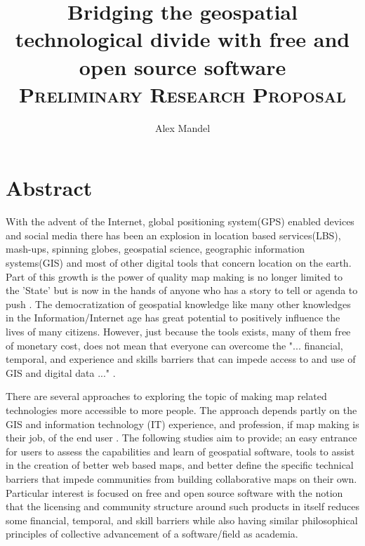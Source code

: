 \documentclass[12pt,letterpaper]{article}
\author{Alex Mandel}
\title{Bridging the geospatial technological divide with free and open source software
\\	
\textsc{\small Preliminary Research Proposal}\\[0.5cm]
}
\begin{document}
\maketitle
\tableofcontents
\onehalfspace
\section{Abstract}

	With the advent of the Internet, global positioning system(GPS) enabled devices and social media there has been an explosion in location based services(LBS), mash-ups, spinning globes, geospatial science, geographic information systems(GIS) and most of other digital tools that concern location on the earth. Part of this growth is the power of quality map making is no longer limited to the 'State' but is now in the hands of anyone who has a story to tell or agenda to push \parencite{Wood2010}. The democratization of geospatial knowledge like many other knowledges in the Information/Internet age has great potential to positively influence the lives of many citizens. However, just because the tools exists, many of them free of monetary cost, does not mean that everyone can overcome the "... financial, temporal, and experience and skills barriers that can impede access to and use of GIS and digital data ..." \parencite{Elwood2006}. 


	There are several approaches to exploring the topic of making map related technologies more accessible to more people. The approach depends partly on the GIS and information technology (IT) experience, and profession, if map making is their job, of the end user \parencite{Donnelly2010}. The following studies aim to provide; an easy entrance for users to assess the capabilities and learn of geospatial software, tools to assist in the creation of better web based maps, and better define the specific technical barriers that impede communities from building collaborative maps on their own. Particular interest is focused on free and open source software\parencite{Lindberg2008} with the notion that the licensing and community structure around such products in itself reduces some financial, temporal, and skill barriers while also having similar philosophical principles of collective advancement of a software/field as academia. 
\end{document}
